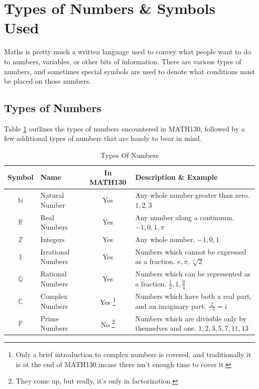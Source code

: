 \section{Types of Numbers \& Symbols Used}
\label{sec:TypesOfNumbersAndSymbolsUsed}
Maths is pretty much a written language used to convey what people want to do
to numbers, variables, or other bits of information. There are various types
of numbers, and sometimes special symbols are used to denote what conditions
must be placed on those numbers.\\
\subsection{Types of Numbers}
\label{sec:TypesOfNumbersUsed}
Table \ref{tab:TypesOfNumbers} outlines the types of numbers encountered in
MATH130, followed by a few additional types of numbers that are handy to bear
in mind.
\begin{table}[!htb]
\label{tab:TypesOfNumbers}
\begin{tabularx}{\linewidth}{| c | l | c | X |} \hline
  Symbol & Name & In MATH130 & Description \& Example \\ \hline \hline
  $\mathbb{N}$ & Natural Number     & Yes & Any whole number greater than
                                            zero. $1, 2, 3 $ \\ \hline
  $\mathbb{R}$ & Real Numbers       & Yes & Any number along a continuum.
                                            $-1, 0, 1, \pi $ \\ \hline
  $\mathbb{Z}$ & Integers           & Yes & Any whole number.
                                            $-1, 0, 1 $ \\ \hline
  $\mathbb{I}$ & Irrational Numbers & Yes & Numbers which cannot be expressed
                                            as a fraction.
                                            $ e, \pi, \sqrt[2]{2} $ \\ \hline
  $\mathbb{Q}$ & Rational Numbers   & Yes & Numbers which can be represented as a
                                            fraction.
                                            $ \frac{1}{2}, 1, \frac{0}{4} $
                                            \\ \hline
  $\mathbb{C}$ & Complex Numbers    & Yes \footnote{Only a brief introduction
  to complex numbers is covered, and traditionally it is at the end of MATH130
  incase there isn't enough time to cover it.}
                                            & Numbers which have both a real
                                            part, and an imaginary part.
                                            $ \frac{2}{-1} = i $ \\ \hline
  $\mathbb{P}$ & Prime Numbers      & No \footnote{They come up, but really, it's
 only in factorization.}
                                            & Numbers which are divisible only
                                            by themselves and one.
                                            $1, 2, 3, 5, 7, 11, 13 $ \\  \hline
\end{tabularx}
\caption{Types Of Numbers}
\end{table}
\newpage
